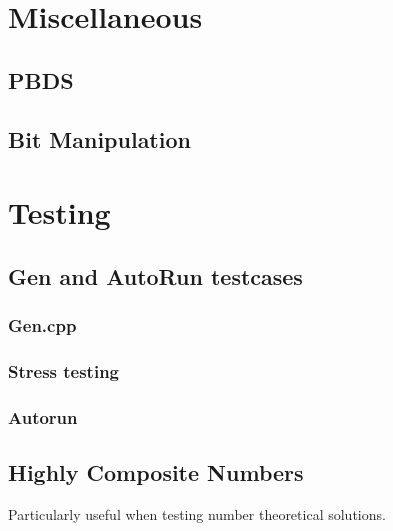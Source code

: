 \section{Miscellaneous}
\subsection{PBDS}
\subsection{Bit Manipulation}

\section{Testing}
\subsection{Gen and AutoRun testcases}
\subsubsection{Gen.cpp}
\subsubsection{Stress testing}
%
\subsubsection{Autorun}
%
\subsection{Highly Composite Numbers}
Particularly useful when testing number theoretical solutions.
%




